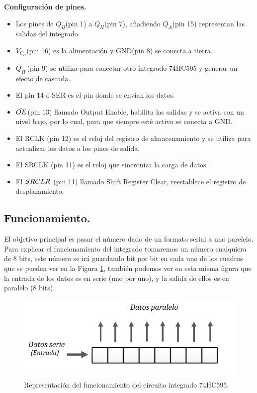 \documentclass{article}
\begin{document}
\textbf{Configuración de pines.}
\newline
\begin{itemize}
\item Los pines de $Q_B$(pin 1) a $Q_H$(pin 7), añadiendo $Q_A$(pin 15) representan las salidas del integrado.
\item $V_C_C$(pin 16) es la alimentación y GND(pin 8) se conecta a tierra.
\item $Q_H_'$(pin 9) se utiliza para conectar otro integrado 74HC595 y generar un efecto de cascada.
\item El pin 14 o SER es el pin donde se envían los datos.
\item $\Bar{OE}$(pin 13) llamado Output Enable, habilita las salidas y se activa con un nivel bajo, por lo cual, para que siempre esté activo se conecta a GND.
\item El RCLK (pin 12) es el reloj del registro de almacenamiento y se utiliza para actualizar los datos a los pines de salida.
\item El SRCLK (pin 11) es el reloj que sincroniza la carga de datos.
\item El $\Bar{SRCLR}$ (pin 11) llamado Shift Register Clear, reestablece el registro de desplazamiento.


\end{itemize}

\subsection{Funcionamiento.}\label{integrado funcionamiento}
El objetivo principal es pasar el número dado de un formato serial a uno parelelo. Para explicar el funcionamiento del integrado tomaremos un número cualquiera de 8 bits, este número se irá guardando bit por bit en cada uno de los cuadros que se pueden ver en la Figura \ref{fig:func1}, también podemos ver en esta misma figura que la entrada de los datos es en serie (uno por uno), y la salida de ellos es en paralelo (8 bits).


\begin{figure}[h]
\includegraphics[scale=0.8]{funcionamiento1.png}
\centering
\caption{Representación del funcionamiento del circuito integrado 74HC595.}
\label{fig:func1}
\end{figure}
\end{document}
